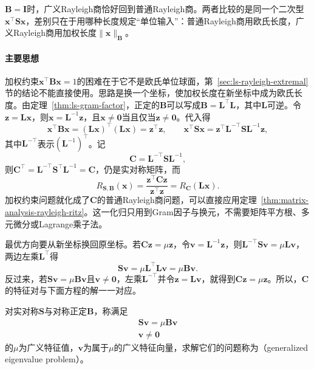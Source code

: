 $\bm B=\bm I$时，广义Rayleigh商恰好回到普通Rayleigh商。两者比较的是同一个二次型$\bm x^\top\bm S\bm x$，差别只在于用哪种长度规定“单位输入”：普通Rayleigh商用欧氏长度，广义Rayleigh商用加权长度$\lVert\bm x\rVert_{\bm B}$。

\paragraph{主要思想}

加权约束$\bm x^\top\bm B\bm x=1$的困难在于它不是欧氏单位球面，第~\ref{sec:ls-rayleigh-extremal}节的结论不能直接使用。思路是换一个坐标，使加权长度在新坐标中成为欧氏长度。由定理~\ref{thm:ls-gram-factor}，正定的$\bm B$可以写成$\bm B=\bm L^\top\bm L$，其中$\bm L$可逆。令$\bm z=\bm L\bm x$，则$\bm x=\bm L^{-1}\bm z$，且$\bm x\neq\bm0$当且仅当$\bm z\neq\bm0$。代入得
\[
 \bm x^\top\bm B\bm x=(\bm L\bm x)^\top(\bm L\bm x)=\bm z^\top\bm z,\qquad
 \bm x^\top\bm S\bm x=\bm z^\top\bm L^{-\top}\bm S\bm L^{-1}\bm z ,
\]
其中$\bm L^{-\top}$表示$(\bm L^{-1})^\top$。记
\[
 \bm C=\bm L^{-\top}\bm S\bm L^{-1},
\]
则$\bm C^\top=\bm L^{-\top}\bm S^\top\bm L^{-1}=\bm C$，仍是实对称矩阵，而
\[
 R_{\bm S,\bm B}(\bm x)=\frac{\bm z^\top\bm C\bm z}{\bm z^\top\bm z}=R_{\bm C}(\bm L\bm x).
\]
加权约束问题就化成了$\bm C$的普通Rayleigh商问题，可以直接应用定理~\ref{thm:matrix-analysis-rayleigh-ritz}。这一化归只用到Gram因子与换元，不需要矩阵平方根、多元微分或Lagrange乘子法。

最优方向要从新坐标换回原坐标。若$\bm C\bm z=\mu\bm z$，令$\bm v=\bm L^{-1}\bm z$，则$\bm L^{-\top}\bm S\bm v=\mu\bm L\bm v$，两边左乘$\bm L^\top$得
\[
 \bm S\bm v=\mu\bm L^\top\bm L\bm v=\mu\bm B\bm v .
\]
反过来，若$\bm S\bm v=\mu\bm B\bm v$且$\bm v\neq\bm0$，左乘$\bm L^{-\top}$并令$\bm z=\bm L\bm v$，就得到$\bm C\bm z=\mu\bm z$。所以，$\bm C$的特征对与下面方程的解一一对应。

\begin{definition}[广义特征值]
\label{def:matrix-analysis-generalized-eigenvalue}
对实对称$\bm S$与对称正定$\bm B$，称满足
\begin{equation}
\begin{gathered}
\bm S\bm v=\mu\bm B\bm v\\
\bm v\neq\bm0
\end{gathered}
\label{eq:matrix-analysis-generalized-eigenproblem}
\end{equation}
的$\mu$为广义特征值，$\bm v$为属于$\mu$的广义特征向量，求解它们的问题称为（generalized eigenvalue problem）。
\end{definition}

